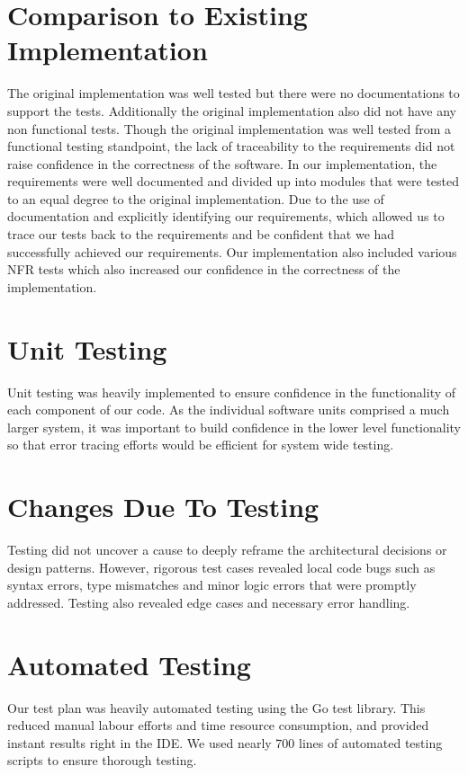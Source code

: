 \documentclass[12pt, titlepage]{article}
\begin{document}
\section{Comparison to Existing Implementation}
The original implementation was well tested but there were no documentations to support the tests. Additionally the original implementation also did not have any non functional tests. Though the original implementation was well tested from a functional testing standpoint, the lack of traceability to the requirements did not raise confidence in the correctness of the software. In our implementation, the requirements were well documented and divided up into modules that were tested to an equal degree to the original implementation. Due to the use of documentation and explicitly identifying our requirements, which allowed us to trace our tests back to the requirements and be confident that we had successfully achieved our requirements. Our implementation also included various NFR tests which also increased our confidence in the correctness of the implementation.

\section{Unit Testing}
Unit testing was heavily implemented to ensure confidence in the functionality of each component of our code. As the individual software units comprised a much larger system, it was important to build confidence in the lower level functionality so that error tracing efforts would be efficient for system wide testing.

\section{Changes Due To Testing}
Testing did not uncover a cause to deeply reframe the architectural decisions or design patterns. However, rigorous test cases revealed local code bugs such as syntax errors, type mismatches and minor logic errors that were promptly addressed. Testing also revealed edge cases and necessary error handling. 

\section{Automated Testing}
Our test plan was heavily automated testing using the Go test library. This reduced manual labour efforts and time resource consumption, and provided instant results right in the IDE. We used nearly 700 lines of automated testing scripts to ensure thorough testing.
\end{document}
